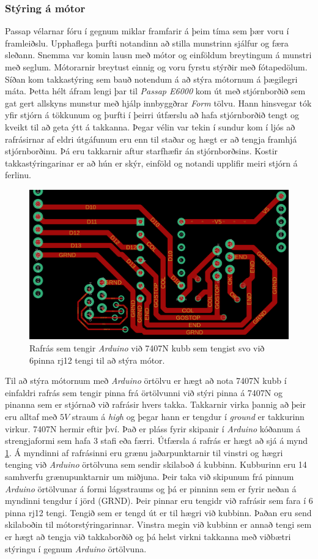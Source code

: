 \subsubsection{Stýring á mótor}
Passap vélarnar fóru í gegnum miklar framfarir á þeim tíma sem þær voru í framleiðslu. Upphaflega þurfti notandinn að stilla munstrinn sjálfur og færa sleðann. Snemma var komin lausn með mótor og einföldum breytingum á munstri með seglum. Mótorarnir breytust einnig og voru fyrstu stýrðir með fótapedölum. Síðan kom takkastýring sem bauð notendum á að stýra mótornum á þægilegri máta. Þetta hélt áfram lengi þar til \textit{Passap E6000} kom út með stjórnborðið sem gat gert allskyns munstur með hjálp innbyggðrar \textit{Form} tölvu. Hann hinsvegar tók yfir stjórn á tökkunum og þurfti í þeirri útfærslu að hafa stjórnborðið tengt og kveikt til að geta ýtt á takkanna. Þegar vélin var tekin í sundur kom í ljós að rafrásirnar af eldri útgáfunum eru enn til staðar og hægt er að tengja framhjá stjórnborðinu. Þá eru takkarnir aftur starfhæfir án stjórnborðsins. Kostir takkastýringarinar er að hún er skýr, einföld og notandi upplifir meiri stjórn á ferlinu.
\begin{figure}[H] %
    \centering
    \includegraphics[width=0.75\linewidth]{myndir/PASSAPMOTOR.png}
    \caption{Rafrás sem tengir \textit{Arduino} við 7407N kubb sem tengist svo við 6pinna rj12 tengi til að stýra mótor. }
    \label{fig:PASSAPMOTOR}
\end{figure}
Til að stýra mótornum með \textit{Arduino} örtölvu er hægt að nota 7407N kubb í einfaldri rafrás sem tengir pinna frá örtölvunni við stýri pinna á 7407N og pinanna sem er stjórnað við rafrásir hvers takka. Takkarnir virka þannig að þeir eru alltaf með $5V$ straum á \textit{high} og þegar hann er tengdur í \textit{ground} er takkurinn virkur. 7407N hermir eftir því. Það er pláss fyrir skipanir í \textit{Arduino} kóðanum á strengjaformi sem hafa 3 stafi eða færri. 
Útfærsla á rafrás er hægt að sjá á mynd \ref{fig:PASSAPMOTOR}. Á myndinni af rafrásinni eru grænu jaðarpunktarnir til vinstri og hægri tenging við \textit{Arduino} örtölvuna sem sendir skilaboð á kubbinn. Kubburinn eru 14 samhverfu grænupunktarnir um miðjuna. Þeir taka við skipunum frá pinnum \textit{Arduino} örtölvunar á formi lágsstraums og þá er pinninn sem er fyrir neðan á myndinni tengdur í jörd (GRND). Þeir pinnar eru tengidr við rafrásir sem fara í 6 pinna rj12 tengi. Tengið sem er tengd út er til hægri við kubbinn. Þaðan eru send skilaboðin til mótorstýringarinnar. Vinstra megin við kubbinn er annað tengi sem er hægt að tengja við takkaborðið og þá helst virkni takkanna með viðbætri stýringu í gegnum \textit{Arduino} örtölvuna.

